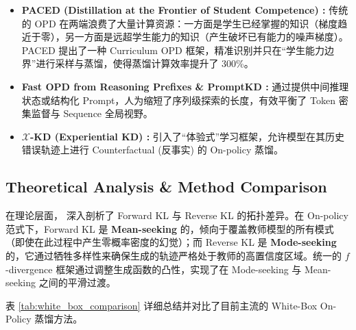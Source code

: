 \documentclass{article}
\begin{document}
\begin{itemize}
    \item \textbf{PACED (Distillation at the Frontier of Student Competence) \cite{2603.11178}:} 传统的 OPD 在两端浪费了大量计算资源：一方面是学生已经掌握的知识（梯度趋近于零），另一方面是远超学生能力的知识（产生破坏已有能力的噪声梯度）。PACED 提出了一种 Curriculum OPD 框架，精准识别并只在“学生能力边界”进行采样与蒸馏，使得蒸馏计算效率提升了 300\%。
    \item \textbf{Fast OPD from Reasoning Prefixes \cite{2602.15260} \& PromptKD \cite{2402.12842}:} 通过提供中间推理状态或结构化 Prompt，人为缩短了序列级探索的长度，有效平衡了 Token 密集监督与 Sequence 全局视野。
    \item \textbf{$\mathcal{X}$-KD (Experiential KD) \cite{2602.12674}:} 引入了“体验式”学习框架，允许模型在其历史错误轨迹上进行 Counterfactual (反事实) 的 On-policy 蒸馏。
\end{itemize}

\subsection{Theoretical Analysis \& Method Comparison}
\label{subsec:theory_whitebox}

在理论层面，\cite{2404.02657} 深入剖析了 Forward KL 与 Reverse KL 的拓扑差异。在 On-policy 范式下，Forward KL 是 \textbf{Mean-seeking} 的，倾向于覆盖教师模型的所有模式（即使在此过程中产生零概率密度的幻觉）；而 Reverse KL 是 \textbf{Mode-seeking} 的，它通过牺牲多样性来确保生成的轨迹严格处于教师的高置信度区域。统一的 $f$-divergence 框架通过调整生成函数的凸性，实现了在 Mode-seeking 与 Mean-seeking 之间的平滑过渡。

表 \ref{tab:white_box_comparison} 详细总结并对比了目前主流的 White-Box On-Policy 蒸馏方法。
\end{document}
